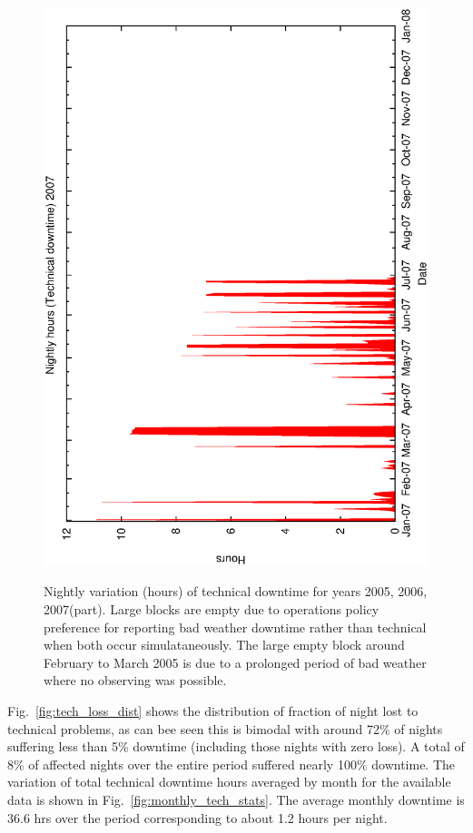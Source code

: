 \begin{figure}[htbp]
\begin{center}
{    \includegraphics[scale=0.3, angle=-90]{figures/ecs/met_nightly_stats_tech2007.eps} 
    \label{fig:nightly_tech2007}
  }
\caption[Nightly variation of technical downtime for years 2005, 2006, 2007(part).]{Nightly variation (hours) of technical downtime for years 2005, 2006, 2007(part). Large blocks are empty due to operations policy preference for reporting bad weather downtime rather than technical when both occur simulataneously. The large empty block around February to March 2005 is due to a prolonged period of bad weather where no observing was possible.}
\end{center}
\label{fig:met_nightly_tech}
\end{figure}


Fig.~\ref{fig:tech_loss_dist} shows the distribution of fraction of night lost to technical problems, as can bee seen this is bimodal with around 72\% of nights suffering less than 5\% downtime (including those nights with zero loss). A total of 8\% of affected nights over the entire period suffered nearly 100\% downtime.  The variation of total technical downtime hours averaged by month for the available data is shown in Fig.~\ref{fig:monthly_tech_stats}. The average monthly downtime is 36.6 hrs over the period corresponding to about 1.2 hours per night.

